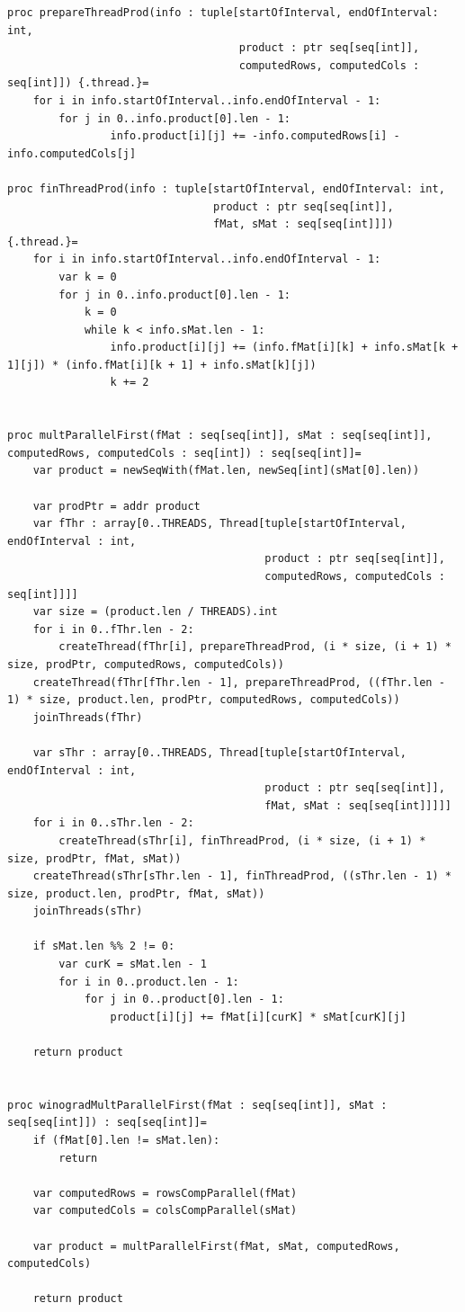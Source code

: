 \documentclass[12pt]{report}
\begin{document}
\begin{lstlisting}[caption=Реализация первой схемы параллельного алгоритма Копперсмита-Винограда,
label={list:paral}]
proc prepareThreadProd(info : tuple[startOfInterval, endOfInterval: int,
                                    product : ptr seq[seq[int]],
                                    computedRows, computedCols : seq[int]]) {.thread.}=
    for i in info.startOfInterval..info.endOfInterval - 1:
        for j in 0..info.product[0].len - 1:
                info.product[i][j] += -info.computedRows[i] - info.computedCols[j]

proc finThreadProd(info : tuple[startOfInterval, endOfInterval: int,
                                product : ptr seq[seq[int]],
                                fMat, sMat : seq[seq[int]]]) {.thread.}=
    for i in info.startOfInterval..info.endOfInterval - 1:
        var k = 0
        for j in 0..info.product[0].len - 1:
            k = 0
            while k < info.sMat.len - 1:
                info.product[i][j] += (info.fMat[i][k] + info.sMat[k + 1][j]) * (info.fMat[i][k + 1] + info.sMat[k][j])
                k += 2


proc multParallelFirst(fMat : seq[seq[int]], sMat : seq[seq[int]], computedRows, computedCols : seq[int]) : seq[seq[int]]=
    var product = newSeqWith(fMat.len, newSeq[int](sMat[0].len))

    var prodPtr = addr product
    var fThr : array[0..THREADS, Thread[tuple[startOfInterval, endOfInterval : int,
                                        product : ptr seq[seq[int]],
                                        computedRows, computedCols : seq[int]]]]
    var size = (product.len / THREADS).int
    for i in 0..fThr.len - 2:
        createThread(fThr[i], prepareThreadProd, (i * size, (i + 1) * size, prodPtr, computedRows, computedCols))
    createThread(fThr[fThr.len - 1], prepareThreadProd, ((fThr.len - 1) * size, product.len, prodPtr, computedRows, computedCols))
    joinThreads(fThr)

    var sThr : array[0..THREADS, Thread[tuple[startOfInterval, endOfInterval : int,
                                        product : ptr seq[seq[int]],
                                        fMat, sMat : seq[seq[int]]]]]
    for i in 0..sThr.len - 2:
        createThread(sThr[i], finThreadProd, (i * size, (i + 1) * size, prodPtr, fMat, sMat))
    createThread(sThr[sThr.len - 1], finThreadProd, ((sThr.len - 1) * size, product.len, prodPtr, fMat, sMat))
    joinThreads(sThr)

    if sMat.len %% 2 != 0:
        var curK = sMat.len - 1
        for i in 0..product.len - 1:
            for j in 0..product[0].len - 1:
                product[i][j] += fMat[i][curK] * sMat[curK][j]

    return product


proc winogradMultParallelFirst(fMat : seq[seq[int]], sMat : seq[seq[int]]) : seq[seq[int]]=
    if (fMat[0].len != sMat.len):
        return

    var computedRows = rowsCompParallel(fMat)
    var computedCols = colsCompParallel(sMat)

    var product = multParallelFirst(fMat, sMat, computedRows, computedCols)

    return product
\end{lstlisting}
\end{document}
